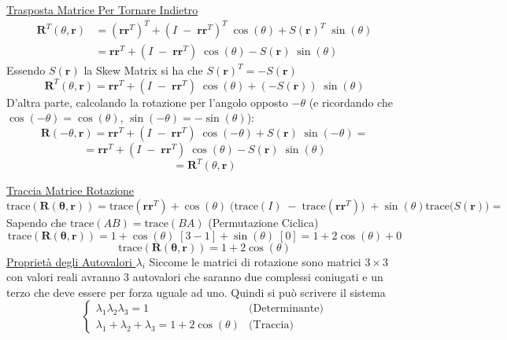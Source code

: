\documentclass[11pt, a4paper]{report}
\begin{document}
\underline{Trasposta Matrice Per Tornare Indietro}
\begin{align*}
    \mathbf{R}^{T}(\theta, \mathbf{r}) &= (\mathbf{r}\mathbf{r}^{T})^{T} + (I \; - \; \mathbf{r}\mathbf{r}^{T})^{T} \; \cos(\theta) + S(\mathbf{r})^{T} \; \sin(\theta)\\
    &= \mathbf{r}\mathbf{r}^{T} + (I \; - \; \mathbf{r}\mathbf{r}^{T}) \; \cos(\theta) - S(\mathbf{r}) \; \sin(\theta)
\end{align*}
Essendo $S(\mathbf{r})$ la Skew Matrix si ha che $S(\mathbf{r})^{T} = - S(\mathbf{r})$
\[
    \mathbf{R}^{T}(\theta, \mathbf{r}) = \mathbf{r}\mathbf{r}^{T} + (I \; - \; \mathbf{r}\mathbf{r}^{T}) \; \cos(\theta) + (- S(\mathbf{r}) )\; \sin(\theta)
\]
D'altra parte, calcolando la rotazione per l'angolo opposto $-\theta$ (e ricordando che $\cos(-\theta) = \cos(\theta)$, $\sin(-\theta) = -\sin(\theta)$):
\[
    \mathbf{R}(-\theta, \mathbf{r}) = \mathbf{r}\mathbf{r}^{T} + (I \; - \; \mathbf{r}\mathbf{r}^{T}) \; \cos(-\theta) + S(\mathbf{r})\; \sin(-\theta) =
\]
\[
    = \mathbf{r}\mathbf{r}^{T} + (I \; - \; \mathbf{r}\mathbf{r}^{T}) \; \cos(\theta) - S(\mathbf{r}) \; \sin(\theta)
\]
\[
    = \mathbf{R}^{T}(\theta, \mathbf{r})
\]

\underline{Traccia Matrice Rotazione}
\[
    \text{trace}(\mathbf{\mathbf{R}(\theta, \mathbf{r})}) = \text{trace}(\mathbf{r}\mathbf{r}^{T}) + \cos(\theta) \; \biggl( \text{trace}(I) \; - \; \text{trace}(\mathbf{r}\mathbf{r}^{T}) \biggr) \; + \sin(\theta) \text{trace}\biggl( S(\mathbf{r}) \biggr) =
\]
Sapendo che \(\text{trace}(AB) = \text{trace}(BA)\) (Permutazione Ciclica)
\[
    \text{trace}(\mathbf{\mathbf{R}(\theta, \mathbf{r})}) = 1 + \cos(\theta) \; [3 - 1] + \sin(\theta) \; [0] = 1 + 2\cos(\theta) + 0
\]
\[
    \text{trace}(\mathbf{\mathbf{R}(\theta, \mathbf{r})}) = 1 + 2\cos(\theta)
\]
\underline{Proprietà degli Autovalori $\lambda_{i}$}\newline
Siccome le matrici di rotazione sono matrici $3 \times 3$ con valori reali avranno 3 autovalori che saranno due complessi coniugati e un terzo che deve essere per forza uguale ad uno. Quindi si può scrivere il sistema
\[
    \begin{cases}
        \lambda_{1}\lambda_{2}\lambda_{3} = 1 & \text{(Determinante)} \\
        \lambda_{1} + \lambda_{2} + \lambda_{3} = 1 + 2\cos(\theta) & \text{(Traccia)}
    \end{cases}
\]
\end{document}
